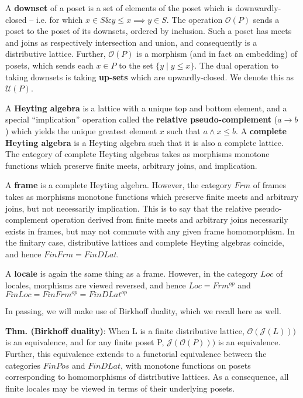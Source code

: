 \documentclass[hoptionsi,review,screen,format=acmsmall]{acmart}
\theoremstyle{definition}
\newcommand{\Oc}{\mathcal{O}}
\newcommand{\Ucc}{\mathcal{U}}
\newcommand{\Jc}{\mathcal{J}}
\newcommand{\band}{\mathop{\&}}
\begin{document}
A \textbf{downset} of a poset is a set of elements of the poset which is downwardly-closed -- i.e. for which \(x \in S \band y \le x \implies y \in S\). The operation \(\Oc(P)\) sends a poset to the poset of its downsets, ordered by inclusion. Such a poset has meets and joins as respectively intersection and union, and consequently is a distributive lattice. Further, \(\Oc(P)\) is a morphism (and in fact an embedding) of posets, which sends each \(x \in P\) to the set \(\{y \mathbin{|} y \le x\}\). The dual operation to taking downsets is taking \textbf{up-sets}  which are upwardly-closed. We denote this as \(\Ucc(P)\).

A \textbf{Heyting algebra} is a lattice with a unique top and bottom element, and a special ``implication'' operation called the \textbf{relative pseudo-complement} (\(a \rightarrow b\)) which yields the unique greatest element \(x\) such that \(a \wedge x \le b\). A \textbf{complete Heyting algebra} is a Heyting algebra such that it is also a complete lattice. The category of complete Heyting algebras takes as morphisms monotone functions which preserve finite meets, arbitrary joins, and implication.

A \textbf{frame} is a complete Heyting algebra. However, the category \(Frm\) of frames takes as morphisms monotone functions which preserve finite meets and arbitrary joins, but not necessarily implication. This is to say that the relative pseudo-complement operation derived from finite meets and arbitrary joins necessarily exists in frames, but may not commute with any given frame homomorphism. In the finitary case, distributive lattices and complete Heyting algebras coincide, and hence \(FinFrm = FinDLat\).

A \textbf{locale} is again the same thing as a frame. However, in the category \(Loc\) of locales, morphisms are viewed reversed, and hence \(Loc = Frm^{op}\) and \(FinLoc = FinFrm^{op} = FinDLat^{op}\)

In passing, we will make use of Birkhoff duality, which we recall here as well.

\textbf{Thm. (Birkhoff duality)}: When L is a finite distributive lattice, \(\Oc(\Jc(L)))\) is an equivalence, and for any finite poset P,  \(\Jc(\Oc(P)))\) is an equivalence. Further, this equivalence extends to a functorial equivalence between the categories \(FinPos\) and \(FinDLat\), with monotone functions on posets corresponding to homomorphisms of distributive lattices. As a consequence, all finite locales may be viewed in terms of their underlying posets.
\end{document}
